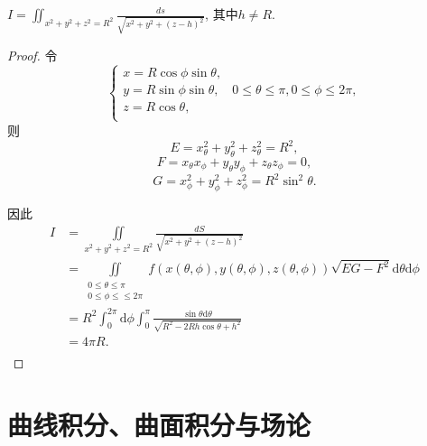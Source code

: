   \begin{exercise}
   $I=\iint_{x^2+y^2+z^2=R^2}\frac{ds}{\sqrt{x^2+y^2+(z-h)^2}}$,
   其中$h\neq R$. %
  \end{exercise} 
  
  \begin{proof}
  令
  \[
	\begin{cases}
	x=R\cos\phi\sin\theta,&\\
	y=R\sin\phi\sin\theta,&0\leq\theta\leq\pi,0\leq\phi\leq2\pi,\\
	z=R\cos\theta,\\
	\end{cases}  
  \]
则$$E=x_{\theta}^2+y_{\theta}^2+z_{\theta}^2=R^2,$$
$$F=x_{\theta}x_{\phi}+y_{\theta}y_{\phi}+z_{\theta}z_{\phi}=0,$$
$$G=x_{\phi}^2+y_{\phi}^2+z_{\phi}^2=R^2\sin^2\theta.$$

因此
\begin{align*}
I&=\iint\limits_{x^2+y^2+z^2=R^2}\frac{dS}{\sqrt{x^2+y^2+(z-h)^2}}\\
&=\iint\limits_{\substack{0\leq\theta\leq\pi\\0\leq\phi\leq\leq2\pi}}f(x(\theta,\phi),y(\theta,\phi),z(\theta,\phi))\sqrt{EG-F^2}\mathrm{d}\theta\mathrm{d}\phi\\
&=R^2\int_0^{2\pi}\mathrm{d}\phi\int_0^{\pi}\frac{\sin\theta\mathrm{d}\theta}{\sqrt{R^2-2Rh\cos\theta+h^2}}\\
&=4\pi R.\\
\end{align*}
\end{proof}

\section{曲线积分、曲面积分与场论}  
  
